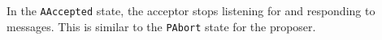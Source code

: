 In the \texttt{AAccepted} state, the acceptor stops listening for and responding
to messages. This is similar to the \texttt{PAbort} state for the proposer.

%
%
%
%
%
